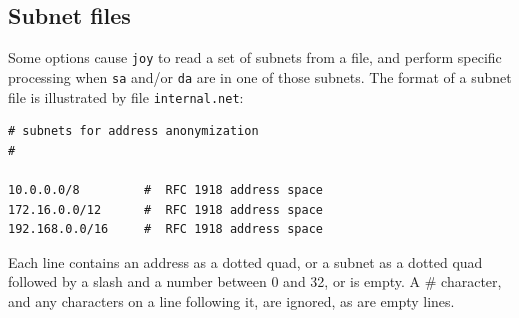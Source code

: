 \documentclass{book}
\begin{document}
\subsection{Subnet files}
\label{subnet}
Some options cause \texttt{joy} to read a set of subnets from a file,
and perform specific processing when \texttt{sa} and/or \texttt{da}
are in one of those subnets.  The format of a subnet file is
illustrated by file \texttt{internal.net}:
\begin{mdframed}[style=cli]
\begin{verbatim}
# subnets for address anonymization
#

10.0.0.0/8         #  RFC 1918 address space
172.16.0.0/12      #  RFC 1918 address space
192.168.0.0/16     #  RFC 1918 address space
\end{verbatim}
\end{mdframed}
Each line contains an address as a dotted quad, or a subnet as a
dotted quad followed by a slash and a number between 0 and 32, or is
empty.  A \# character, and any characters on a line following it, are
ignored, as are empty lines.
\end{document}
